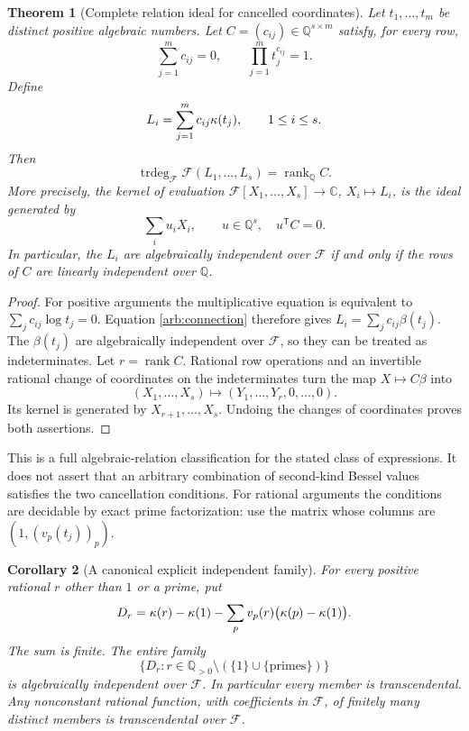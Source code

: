 \documentclass[11pt,a4paper]{article}
\newtheorem{theorem}{Theorem}[section]
\newtheorem{corollary}[theorem]{Corollary}
\theoremstyle{definition}
\theoremstyle{remark}
\numberwithin{equation}{section}
\begin{document}
\begin{theorem}[Complete relation ideal for cancelled coordinates]
\label{arb:relation-ideal}
Let \(t_1,\ldots,t_m\) be distinct positive algebraic numbers.
Let \(C=(c_{ij})\in\mathbb Q^{s\times m}\) satisfy, for every row,
\[
 \sum_{j=1}^m c_{ij}=0,
 \qquad \prod_{j=1}^m t_j^{c_{ij}}=1.
\]
Define
\[
 L_i=\sum_{j=1}^m c_{ij}\kappa(t_j),\qquad 1\leq i\leq s.
\]
Then
\begin{equation}\label{arb:rank-equivalence}
 \operatorname{trdeg}_{\mathcal F}
       \mathcal F(L_1,\ldots,L_s)=\operatorname{rank}_{\mathbb Q}C.
\end{equation}
More precisely, the kernel of evaluation
\(\mathcal F[X_1,\ldots,X_s]\to\mathbb C\),
\(X_i\mapsto L_i\), is the ideal generated by
\[
 \sum_i u_iX_i,\qquad u\in\mathbb Q^s,\quad u^{\mathsf T}C=0.
\]
In particular, the \(L_i\) are algebraically independent over
\(\mathcal F\) if and only if the rows of \(C\) are linearly
independent over \(\mathbb Q\).
\end{theorem}

\begin{proof}
For positive arguments the multiplicative equation is equivalent to
\(\sum_jc_{ij}\log t_j=0\).  Equation
\eqref{arb:connection} therefore gives
\(L_i=\sum_jc_{ij}\beta(t_j)\).
The \(\beta(t_j)\) are algebraically independent over
\(\mathcal F\), so they can be treated as indeterminates.
Let \(r=\operatorname{rank}C\).  Rational row operations and an
invertible rational change of coordinates on the indeterminates turn
the map \(X\mapsto C\beta\) into
\[
 (X_1,\ldots,X_s)\longmapsto
       (Y_1,\ldots,Y_r,0,\ldots,0).
\]
Its kernel is generated by \(X_{r+1},\ldots,X_s\).
Undoing the changes of coordinates proves both assertions.
\end{proof}

This is a full algebraic-relation classification for the stated class
of expressions.  It does not assert that an arbitrary combination
of second-kind Bessel values satisfies the two cancellation conditions.
For rational arguments the conditions are decidable by exact
prime factorization: use the matrix whose columns are
\((1,(v_p(t_j))_p)\).

\begin{corollary}[A canonical explicit independent family]
\label{arb:canonical}
For every positive rational \(r\) other than \(1\) or a prime, put
\begin{equation}\label{arb:Dr}
 D_r=\kappa(r)-\kappa(1)
       -\sum_{p}v_p(r)\bigl(\kappa(p)-\kappa(1)\bigr).
\end{equation}
The sum is finite.  The entire family
\[
 \{D_r:r\in\mathbb Q_{>0}\setminus(\{1\}\cup\{\text{primes}\})\}
\]
is algebraically independent over \(\mathcal F\).
In particular every member is transcendental.  Any nonconstant
rational function, with coefficients in \(\mathcal F\), of finitely
many distinct members is transcendental over \(\mathcal F\).
\end{corollary}
\end{document}
